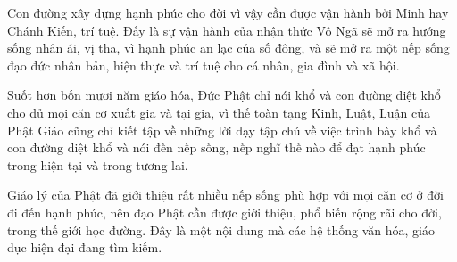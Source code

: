 Con đường xây dựng hạnh phúc cho đời vì vậy cần được vận hành bởi Minh hay Chánh Kiến, trí tuệ. Đấy là sự vận hành của nhận thức Vô Ngã sẽ mở ra hướng sống nhân ái, vị tha, vì hạnh phúc an lạc của số đông, và sẽ mở ra một nếp sống đạo đức nhân bản, hiện thực và trí tuệ cho cá nhân, gia đình và xã hội.

Suốt hơn bốn mươi năm giáo hóa, Đức Phật chỉ nói khổ và con đường diệt khổ cho đủ mọi căn cơ xuất gia và tại gia, vì thế toàn tạng Kinh, Luật, Luận của Phật Giáo cũng chỉ kiết tập về những lời dạy tập chú về việc trình bày khổ và con đường diệt khổ và nói đến nếp sống, nếp nghĩ thế nào để đạt hạnh phúc trong hiện tại và trong tương lai.

Giáo lý của Phật đã giới thiệu rất nhiều nếp sống phù hợp với mọi căn cơ ở đời đi đến hạnh phúc, nên đạo Phật cần được giới thiệu, phổ biến rộng rãi cho đời, trong thế giới học đường. Đây là một nội dung mà các hệ thống văn hóa, giáo dục hiện đại đang tìm kiếm.

